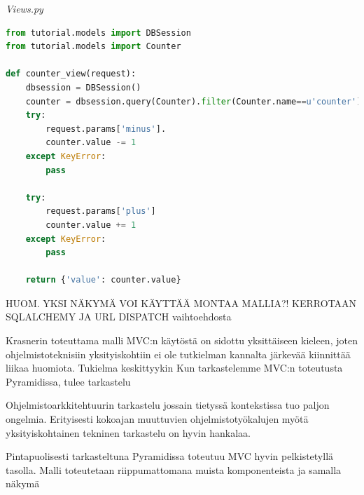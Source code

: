 \documentclass[finnish,utf8,nonumbib,palatino,kandi]{gradu2}
\begin{document}
\emph{Views.py}
\begin{lstlisting}[language=Python]
from tutorial.models import DBSession                                            
from tutorial.models import Counter                                              
                                                                                 
def counter_view(request):                                                       
    dbsession = DBSession()                                                      
    counter = dbsession.query(Counter).filter(Counter.name==u'counter').first()  
    try:                                                                         
        request.params['minus'].                                                 
        counter.value -= 1                                                       
    except KeyError:                                                             
        pass                                                                     
                                                                                 
    try:                                                                         
        request.params['plus']                                                   
        counter.value += 1                                                       
    except KeyError:                                                             
        pass                                                                     
                                                                                 
    return {'value': counter.value}   
\end{lstlisting} 

HUOM. YKSI NÄKYMÄ VOI KÄYTTÄÄ MONTAA MALLIA?!
KERROTAAN SQLALCHEMY JA URL DISPATCH vaihtoehdosta

 Krasnerin toteuttama malli MVC:n käytöstä on sidottu yksittäiseen kieleen, joten ohjelmistoteknisiin yksityiskohtiin ei ole tutkielman kannalta järkevää kiinnittää liikaa huomiota.
Tukielma keskittyykin
 Kun tarkastelemme MVC:n toteutusta Pyramidissa, tulee tarkastelu

 Ohjelmistoarkkitehtuurin tarkastelu jossain tietyssä kontekstissa tuo paljon ongelmia. Erityisesti kokoajan muuttuvien ohjelmistotyökalujen myötä yksityiskohtainen
tekninen tarkastelu on hyvin hankalaa. 

 Pintapuolisesti tarkasteltuna Pyramidissa toteutuu MVC hyvin pelkistetyllä tasolla. 
 Malli toteutetaan riippumattomana muista komponenteista ja samalla näkymä
\end{document}
